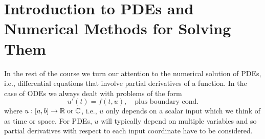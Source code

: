 \chapter{Introduction to PDEs and Numerical Methods for Solving Them}

In the rest of the course we turn our attention to the numerical 
solution of PDEs, i.e., differential equations that 
involve partial derivatives of a function. In the case of 
ODEs we always dealt with problems of the form 
\begin{equation*}
    u'(t) = f(t,u), \quad \text{plus boundary cond.}
\end{equation*}
where $u: [a,b] \to \mathbb{R} \; {\rm or} \; \mathbb{C}$, i.e., $u$ only depends on 
a scalar input which we think of as time or space. For PDEs, 
$u$ will typically depend on multiple variables and so partial 
derivatives with respect to each input coordinate have to be 
considered. 

